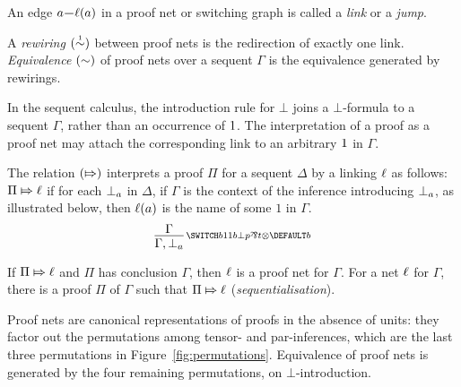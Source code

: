 \documentclass[conference]{IEEEtran}
\begin{document}
\noindent
An edge $\edge a{\links(a)}$ in a proof net or switching graph is called a \emph{link} or a \emph{jump}.
%


\begin{definition}
\label{def:proof net equivalence}
%
A \emph{rewiring} $(\perm*)$ between proof nets is the redirection of exactly one link.
%
\emph{Equivalence} $(\perm)$ of proof nets over a sequent $\Gamma$ is the equivalence generated by rewirings.
%
\end{definition}


\noindent
In the sequent calculus, the introduction rule for $\bot$ joins a $\bot$-formula to a sequent $\Gamma$, rather than an occurrence of $1$.
%
The interpretation of a proof as a proof net may attach the corresponding link to an arbitrary $1$ in $\Gamma$.


\begin{definition}
\label{def:proofs to nets}
%
The relation $(\Mapsto)$ interprets a proof $\Pi$ for a sequent $\Delta$ by a linking $\ell$ as follows:
% 
$\Pi\Mapsto\ell$ if for each $\bot_{a}$ in $\Delta$, if $\Gamma$ is the context of the inference introducing $\bot_{a}$, as illustrated below, then $\ell(a)$ is the name of some $1$ in $\Gamma$.
\[
	\infer[\MLLlabel b]{\Gamma,\named a\bot}{\Gamma}
\]
%
\end{definition}



\begin{proposition}
\label{prop:correctness and sequentialisation}
%
%
If $\Pi\Mapsto\ell$ and $\Pi$ has conclusion $\Gamma$, then $\ell$ is a proof net for $\Gamma$.
%
For a net $\ell$ for $\Gamma$, there is a proof $\Pi$ of $\Gamma$ such that $\Pi\Mapsto\ell$ (\emph{sequentialisation}).
%
\end{proposition}


\noindent
Proof nets are canonical representations of proofs in the absence of units: they factor out the permutations among tensor- and par-inferences, which are the last three permutations in Figure~\ref{fig:permutations}.
%
Equivalence of proof nets is generated by the four remaining permutations, on $\bot$-introduction.
\end{document}
